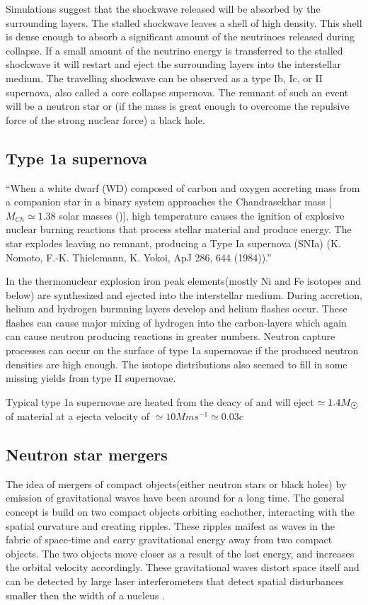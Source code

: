 Simulations suggest that the shockwave released will be absorbed by the surrounding layers. The stalled shockwave leaves a shell of high density. This shell is dense enough to absorb a significant amount of the neutrinoes released during collapse. If a small amount of the neutrino energy is transferred to the stalled shockwave it will restart and eject the surrounding layers into the interstellar medium.
The travelling shockwave can be observed as a type Ib, Ic, or II supernova, also called a core collapse supernova. The remnant of such an event will be a neutron star or (if the mass is great enough to overcome the repulsive force of the strong nuclear force) a black hole.

\subsection{Type 1a supernova}
``When a white dwarf (WD) composed of carbon and oxygen accreting mass from a companion star in
a binary system approaches the Chandrasekhar mass [$M_{Ch} \simeq 1.38$ solar masses (\msol)], high temperature
causes the ignition of explosive nuclear burning reactions that process stellar material and produce energy.
The star explodes leaving no remnant, producing a Type Ia supernova (SNIa) (K. Nomoto, F.-K. Thielemann, K. Yokoi, ApJ 286, 644 (1984)).''\cite{mazzali07}

In the thermonuclear explosion iron peak elements(mostly Ni and Fe isotopes and below) are synthesized and ejected into the interstellar medium. During accretion, helium and hydrogen burmning layers develop and helium flashes occur. These flashes can cause major mixing of hydrogen into the carbon-layers which again can cause neutron producing reactions in greater numbers. Neutron capture processes can occur on the surface of type 1a supernovae if the produced neutron densities are high enough\cite{nomoto84}. The isotope distributions also seemed to fill in some missing yields from type II supernovae.

Typical type 1a supernovae are heated from the deacy of  and will eject $\simeq 1.4 \msol$ of material at a ejecta velocity of $\simeq10 Mm s^{-1} \simeq 0.03c$ 

\subsection{Neutron star mergers}
The idea of mergers of compact objects(either neutron stars or black holes) by emission of gravitational waves have been around for a long time. The general concept is build on two compact objects orbiting eachother, interacting with the spatial curvature and creating ripples. These ripples maifest as waves in the fabric of space-time and carry gravitational energy away from two compact objects. The two objects move closer as a result of the lost energy, and increases the orbital velocity accordingly.
These gravitational waves distort space itself and can be detected by large laser interferometers that detect spatial disturbances smaller then the width of a nucleus .

